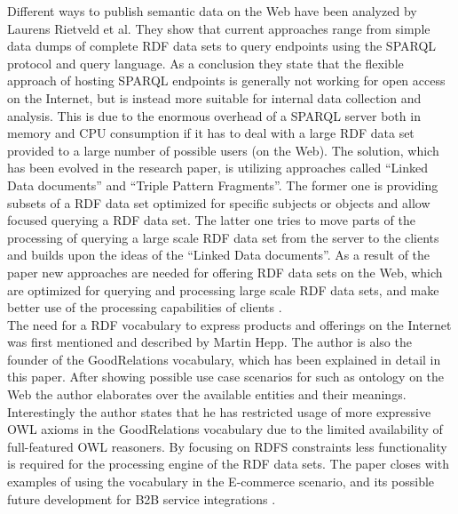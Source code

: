 Different ways to publish semantic data on the Web have been analyzed by Laurens Rietveld et al. They show that current approaches range from simple data dumps of complete \gls{RDF} data sets to query endpoints using the \gls{SPARQL} protocol and query language. As a conclusion they state that the flexible approach of hosting \gls{SPARQL} endpoints is generally not working for open access on the Internet, but is instead more suitable for internal data collection and analysis. This is due to the enormous overhead of a \gls{SPARQL} server both in memory and CPU consumption if it has to deal with a large \gls{RDF} data set provided to a large number of possible users (on the Web). The solution, which has been evolved in the research paper, is utilizing approaches called ``Linked Data documents'' and ``Triple Pattern Fragments''. The former one is providing subsets of a \gls{RDF} data set optimized for specific subjects or objects and allow focused querying a \gls{RDF} data set. The latter one tries to move parts of the processing of querying a large scale \gls{RDF} data set from the server to the clients and builds upon the ideas of the ``Linked Data documents''. As a result of the paper new approaches are needed for offering \gls{RDF} data sets on the Web, which are optimized for querying and processing large scale \gls{RDF} data sets, and make better use of the processing capabilities of clients \citep{rietveld2015linked}. \\

The need for a \gls{RDF} vocabulary to express products and offerings on the Internet was first mentioned and described by Martin Hepp. The author is also the founder of the GoodRelations vocabulary, which has been explained in detail in this paper. After showing possible use case scenarios for such as ontology on the Web the author elaborates over the available entities and their meanings. Interestingly the author states that he has restricted usage of more expressive \gls{OWL} axioms in the GoodRelations vocabulary due to the limited availability of full-featured \gls{OWL} reasoners. By focusing on \gls{RDFS} constraints less functionality is required for the processing engine of the \gls{RDF} data sets. The paper closes with examples of using the vocabulary in the \gls{E-commerce} scenario, and its possible future development for \gls{B2B} service integrations \citep{hepp2008goodrelations}. \\

